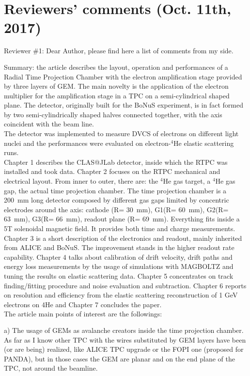 \documentclass[a4paper,11pt,twoside]{article}
\date{\today}
\begin{document}
\section*{Reviewers' comments (Oct. 11th, 2017)}

Reviewer \#1: Dear Author, please find here a list of comments from my side.

Summary: the article describes the layout, operation and performances of a 
Radial Time Projection Chamber with the electron amplification stage provided 
by three layers of GEM. The main novelty is the application of the electron 
multiplier for the amplification stage in a TPC on a semi-cylindrical shaped 
plane. The detector, originally built for the BoNuS experiment, is in fact 
formed by two semi-cylindrically shaped halves connected together, with the 
axis coincident with the beam line.\\
 
The detector was implemented to measure DVCS of electrons on different light 
nuclei and the performances were evaluated on electron-$^4$He elastic 
scattering runs.\\

Chapter 1 describes the CLAS@JLab detector, inside which the RTPC was installed 
and took data. Chapter 2 focuses on the RTPC mechanical and electrical layout.  
From inner to outer, there are: the $^4$He gas target, a $^4$He gas gap, the 
actual time projection chamber. The time projection chamber is a 200~mm long 
detector composed by different gas gaps limited by concentric electrodes around 
the axis: cathode (R= 30~mm), G1(R= 60~mm), G2(R= 63~mm), G3(R= 66~mm), readout 
plane (R= 69~mm). Everything fits inside a 5T solenoidal magnetic field. It 
provides both time and charge measurements. Chapter 3 is a short description of 
the electronics and readout, mainly inherited from ALICE and BoNuS. The 
improvement stands in the higher readout rate capability. Chapter 4 talks about 
calibration of drift velocity, drift paths and energy loss measurements by the 
usage of simulations with MAGBOLTZ and tuning the results on elastic scattering 
data. Chapter 5 concentrates on track finding/fitting procedure and noise 
evaluation and subtraction. Chapter 6 reports on resolution and efficiency from 
the elastic scattering reconstruction of 1 GeV electrons on 4He and Chapter 7 
concludes the paper.\\

The article main points of interest are the followings:

a) The usage of GEMs as avalanche creators inside the time projection chamber.  
As far as I know other TPC with the wires substituted by GEM layers have been 
(or are being) realized, like ALICE TPC upgrade or the FOPI one (proposed for 
PANDA), but in those cases the GEM are planar and on the end plane of the TPC, 
not around the beamline.
\end{document}
